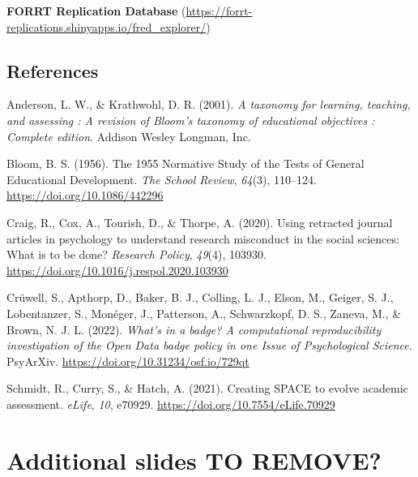 \documentclass[
  letterpaper,
  DIV=11,
  numbers=noendperiod]{scrartcl}
\newlength{\cslhangindent}
\newenvironment{CSLReferences}[2] %
 {\begin{list}{}{%
  \setlength{\itemindent}{0pt}
  \setlength{\leftmargin}{0pt}
  \setlength{\parsep}{0pt}
  \ifodd #1
   \setlength{\leftmargin}{\cslhangindent}
   \setlength{\itemindent}{-1\cslhangindent}
  \fi
  \setlength{\itemsep}{#2\baselineskip}}}
 {\end{list}}
\begin{document}
\textbf{FORRT Replication Database}
(\url{https://forrt-replications.shinyapps.io/fred_explorer/})

\subsection{References}\label{references}

\protect{}\label{refs}
\begin{CSLReferences}{1}{0}
Anderson, L. W., \& Krathwohl, D. R. (2001). \emph{A taxonomy for
learning, teaching, and assessing : A revision of {Bloom}'s taxonomy of
educational objectives : Complete edition}. Addison Wesley Longman, Inc.

Bloom, B. S. (1956). The 1955 {Normative Study} of the {Tests} of
{General Educational Development}. \emph{The School Review},
\emph{64}(3), 110--124. \url{https://doi.org/10.1086/442296}

Craig, R., Cox, A., Tourish, D., \& Thorpe, A. (2020). Using retracted
journal articles in psychology to understand research misconduct in the
social sciences: {What} is to be done? \emph{Research Policy},
\emph{49}(4), 103930. \url{https://doi.org/10.1016/j.respol.2020.103930}

Crüwell, S., Apthorp, D., Baker, B. J., Colling, L. J., Elson, M.,
Geiger, S. J., Lobentanzer, S., Monéger, J., Patterson, A., Schwarzkopf,
D. S., Zaneva, M., \& Brown, N. J. L. (2022). \emph{What's in a badge?
{A} computational reproducibility investigation of the {Open Data} badge
policy in one {Issue} of {Psychological Science}}. PsyArXiv.
\url{https://doi.org/10.31234/osf.io/729qt}

Schmidt, R., Curry, S., \& Hatch, A. (2021). Creating {SPACE} to evolve
academic assessment. \emph{eLife}, \emph{10}, e70929.
\url{https://doi.org/10.7554/eLife.70929}

\end{CSLReferences}

\section{Additional slides TO
REMOVE?}\label{additional-slides-to-remove}
\end{document}
